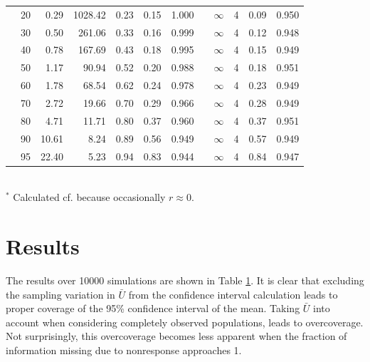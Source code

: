 \documentclass[12pt, a4paper]{article}
\begin{document}
\begin{table}[b!]
\begin{tabular}{lrrrrrrrrrrr}
   & 20 & 0.29 & 1028.42 & 0.23 & 0.15 & 1.000 	&&  $\infty$ & 4 &  0.09 & 0.950   \\ 
   & 30 & 0.50 & 261.06 & 0.33 & 0.16 & 0.999 		&&  $\infty$ & 4 &  0.12 & 0.948  	\\ 
   & 40 & 0.78 & 167.69 & 0.43 & 0.18 & 0.995	 	&&  $\infty$ & 4 &  0.15 & 0.949 	\\ 
   & 50 & 1.17 & 90.94 & 0.52 & 0.20 & 0.988 	 	&&  $\infty$ & 4 &  0.18 & 0.951 	\\ 
   & 60 & 1.78 & 68.54 & 0.62 & 0.24 & 0.978 	 	&&  $\infty$ & 4 &  0.23 & 0.949 	\\ 
   & 70 & 2.72 & 19.66 & 0.70 & 0.29 & 0.966 	 	&&  $\infty$ & 4 &  0.28 & 0.949 	\\ 
   & 80 & 4.71 & 11.71 & 0.80 & 0.37 & 0.960 	 	&&  $\infty$ & 4 &  0.37 & 0.951 	\\ 
   & 90 & 10.61 & 8.24 & 0.89 & 0.56 & 0.949 	 	&&  $\infty$ & 4 &  0.57 & 0.949 	\\ 
   & 95 & 22.40 & 5.23 & 0.94 & 0.83 & 0.944 	 	&&  $\infty$ & 4 &  0.84 & 0.947 	\\ 
   \hline
\end{tabular}
\\$^{*}$ Calculated cf. \citet{barnard1999} because occasionally $r\approx0$. \hfill \label{tab:results}
\end{table}
\section*{Results}
The results over 10000 simulations are shown in Table \ref{tab:results}. It is clear that excluding the sampling variation in $\bar{U}$ from the confidence interval calculation leads to proper coverage of the 95\% confidence interval of the mean. Taking $\bar{U}$ into account when considering completely observed populations, leads to overcoverage. Not surprisingly, this overcoverage becomes less apparent when the fraction of information missing due to nonresponse approaches 1. 
\end{document}
